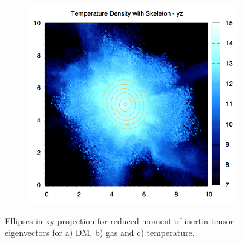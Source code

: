 \documentclass[journal]{IEEEtran}
\begin{document}
\begin{figure}[!t]
\begin{subfigure}[t]{0.3\textwidth}
	\end{subfigure}
	\quad
	\begin{subfigure}[t]{0.3\textwidth}
		\centering
		\includegraphics[width=\linewidth]{TempDenEllipyz.png}
	\end{subfigure}
\label{fig:ellipses}
\caption{Ellipses in xy projection for reduced moment of inertia tensor eigenvectors for a) DM, b) gas and c) temperature.}
\end{figure}
\end{document}
